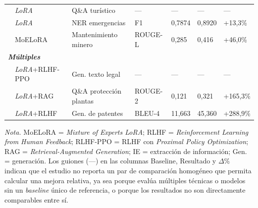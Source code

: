 \begin{longtable}{p{3.5cm} p{1.7cm} p{3.0cm} p{1.8cm} p{1.3cm} p{1.3cm} p{0.9cm}}
\scriptsize\autocite{zhang2025ft} & \scriptsize\textit{LoRA} & \scriptsize Q\&A turístico & \scriptsize --- & \scriptsize --- & \scriptsize --- & \scriptsize --- \\
\scriptsize\autocite{zhou2025kg} & \scriptsize\textit{LoRA} & \scriptsize NER emergencias & \scriptsize F1 & \scriptsize 0,7874 & \scriptsize 0,8920 & \scriptsize +13,3\% \\
\scriptsize\autocite{cao2025lora} & \scriptsize MoELoRA & \scriptsize Mantenimiento minero & \scriptsize ROUGE-L & \scriptsize 0,285 & \scriptsize 0,416 & \scriptsize +46,0\% \\
\multicolumn{7}{l}{\scriptsize\textbf{\textit{Múltiples}}} \\[2pt]
\scriptsize\autocite{peng2025keyword} & \scriptsize\textit{LoRA}+RLHF-PPO & \scriptsize Gen. texto legal & \scriptsize --- & \scriptsize --- & \scriptsize --- & \scriptsize --- \\
\scriptsize\autocite{xiong2025lora} & \scriptsize\textit{LoRA}+RAG & \scriptsize Q\&A protección plantas & \scriptsize ROUGE-2 & \scriptsize 0,121 & \scriptsize 0,321 & \scriptsize +165,3\% \\
\scriptsize\autocite{ren2025patent} & \scriptsize\textit{LoRA}+RLHF & \scriptsize Gen. de patentes & \scriptsize BLEU-4 & \scriptsize 11,663 & \scriptsize 45,360 & \scriptsize +288,9\% \\
\end{longtable}

\begin{flushleft}
\scriptsize
\textit{Nota.} MoELoRA = \textit{Mixture of Experts LoRA}; RLHF = \textit{Reinforcement Learning from Human Feedback}; RLHF-PPO = RLHF con \textit{Proximal Policy Optimization}; RAG = \textit{Retrieval-Augmented Generation}; IE = extracción de información; Gen. = generación. Los guiones (---) en las columnas Baseline, Resultado y $\Delta$\% indican que el estudio no reporta un par de comparación homogéneo que permita calcular una mejora relativa, ya sea porque evalúa múltiples técnicas o modelos sin un \textit{baseline} único de referencia, o porque los resultados no son directamente comparables entre sí.
\end{flushleft}